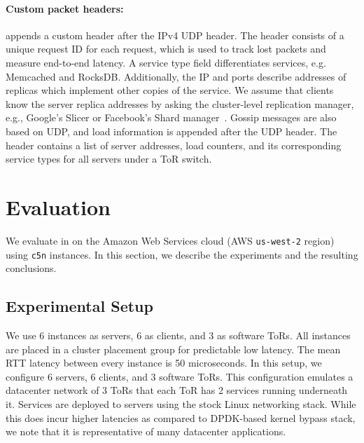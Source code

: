 \paragraph{Custom packet headers:} \daronpon appends a custom header after
the IPv4 UDP header. The header consists of a unique request ID for each
request, which is used to track lost packets and measure end-to-end
latency. A service type field differentiates services, e.g. Memcached
and RocksDB.  Additionally, the IP and ports describe addresses of
replicas which implement other copies of the service.  We assume that
clients know the server replica addresses by asking the cluster-level
replication manager, e.g., Google's Slicer or Facebook's Shard
manager~\cite{facebook_shard,google_slicer,microsoft_service_fabric}.
Gossip messages are also based on UDP, and load information is
appended after the UDP header.  The header contains a list of server
addresses, load counters, and its corresponding service types for all
servers under a ToR switch. 

\section{Evaluation}
\label{daronpon:sec:eval}

\newcommand{\racks}[0]{3\xspace}
\newcommand{\services}[0]{2\xspace}
\newcommand{\servers}[0]{6\xspace}
\newcommand{\servercores}{1\xspace}
\newcommand{\tors}{3\xspace}
\newcommand{\torscores}{16\xspace}
\newcommand{\clients}{6\xspace}
\newcommand{\clientcores}{1\xspace}

We evaluate \daronpon in on the Amazon Web Services cloud (AWS
\texttt{us-west-2} region) using \texttt{c5n} instances. 
%
In this section, we describe the experiments and the resulting conclusions.

\subsection{Experimental Setup}
We use \servers instances as servers, \clients as clients, and
\tors as software ToRs. 
%
All instances are placed in a cluster placement group for predictable low latency. 
%
The mean RTT latency between every instance is 50 microseconds. 
%
In this setup, we configure \servers servers, \clients clients, and \tors software ToRs. 
%
This configuration emulates a datacenter network of \tors ToRs that each ToR has \services services running underneath it.  
%
Services are deployed to servers using the stock Linux networking stack.  
%
While this does incur higher latencies as compared to DPDK-based kernel bypass stack, we note that it is representative of many datacenter applications.

